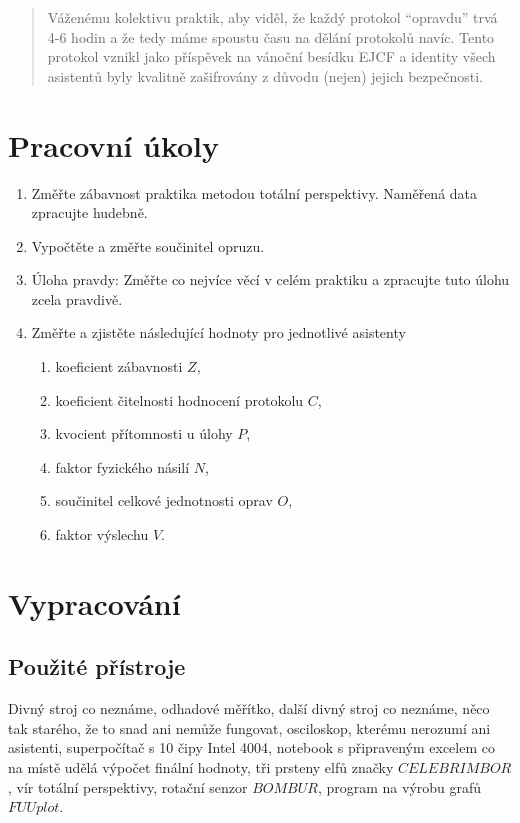 \documentclass[english]{article}
\begin{document}


\begin{abstract}
Váženému kolektivu praktik, aby viděl, že každý protokol “opravdu” trvá 4-6 hodin a že tedy máme spoustu času na dělání protokolů navíc. Tento protokol vznikl jako příspěvek na vánoční besídku EJCF a identity všech asistentů byly kvalitně zašifrovány z důvodu (nejen) jejich bezpečnosti.
\end{abstract}

\setlength{\parindent}{0.5cm}



\section{Pracovní úkoly}
	\begin{enumerate}
		\item Změřte zábavnost praktika metodou totální perspektivy. Naměřená data zpracujte hudebně.
		
		\item Vypočtěte a změřte součinitel opruzu.
		
		\item Úloha pravdy: Změřte co nejvíce věcí v celém praktiku a zpracujte tuto úlohu zcela pravdivě.
		
		\item Změřte a zjistěte následující hodnoty pro jednotlivé asistenty
		\begin{enumerate}[label=\alph*)]
			\item koeficient zábavnosti $Z$,
			\item koeficient čitelnosti hodnocení protokolu $C$,
			\item kvocient přítomnosti u úlohy $P$,
			\item faktor fyzického násilí $N$,
			\item součinitel celkové jednotnosti oprav $O$,
			\item faktor výslechu $V$.
		\end{enumerate}
	\end{enumerate}

\section{Vypracování}
\subsection{Použité přístroje}
Divný stroj co neznáme, odhadové měřítko, další divný stroj co neznáme, něco tak starého, že to snad ani nemůže fungovat, osciloskop, kterému nerozumí ani asistenti, superpočítač s 10 čipy Intel 4004, notebook s připraveným excelem co na místě udělá výpočet finální hodnoty, tři prsteny elfů značky $CELEBRIMBOR$, vír totální perspektivy, rotační senzor $BOMBUR$, program na výrobu grafů $FUUplot$.
\end{document}
